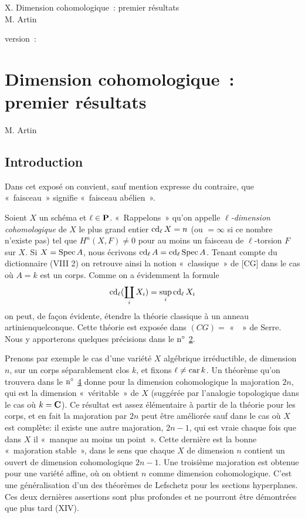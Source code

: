 \documentclass[10pt]{../fichiers-configuration-latex/smfart}
\begin{document}
\begin{center}
X. Dimension cohomologique : premier résultats\\
M. Artin
\end{center}

version : \showgitstatus{}
\tableofcontents

\else
\chapter{Dimension cohomologique : premier résultats}
\begin{center}
M. Artin
\end{center}
\fi

\setcounter{pageoriginal}{42}

\section{Introduction}\pageoriginale

Dans cet exposé on convient, sauf mention expresse du contraire, que
« faisceau » signifie « faisceau abélien ».

Soient $X$ un schéma et $\ell\in \mathbf{P}$. « Rappelons » qu'on appelle
\emph{$\ell$-dimension cohomologique} de $X$ le plus grand entier
$\operatorname{cd}_{\ell}X=n$ (ou $=\infty$ si ce nombre n'existe pas) tel que
$H^n(X,F)\neq 0$ pour au moins un faisceau de $\ell$-torsion $F$ sur
$X$. Si $X=\operatorname{Spec} A$, nous écrivons $\operatorname{cd}_{\ell} A=\operatorname{cd}_{\ell}\operatorname{Spec}
A$. Tenant compte du dictionnaire (VIII 2) %
on retrouve ainsi la notion « classique » de [CG] dans le cas où $A=k$ est un corps. Comme on
a évidemment la formule
$$
\operatorname{cd}_{\ell}(\coprod_i X_i)=\displaystyle{\mathop{\sup}_i} \operatorname{cd}_{\ell}X_i
$$
on peut, de façon évidente, étendre la théorie classique à un
anneau artinien\pageoriginale quelconque. Cette théorie est exposée dans
$(CG)=$ «  » %
de Serre. Nous y apporterons quelques précisions dans le ${\rm n^{\circ}}$ \hyperref[X.sec2]{2}.

Prenons par exemple le cas d'une variété $X$ algébrique irréductible,
de dimension $n$, sur un corps séparablement clos $k$, et fixons
$\ell\neq \operatorname{car} k$. Un théorème qu'on trouvera dans le ${\rm
  n^{\circ}}$ \hyperref[X.sec4]{4} donne pour la dimension cohomologique la majoration
$2n$, qui est la dimension « véritable » de $X$ (suggérée par
l'analogie topologique dans le cas où $k=\mathbf{C}$). Ce résultat est
assez élémentaire à partir de la théorie pour les corps, et en fait la
majoration par $2n$ peut être améliorée sauf dans le cas où $X$ est
complète: il existe une autre majoration, $2n-1$, qui est vraie chaque
fois que dans $X$ il « manque au moins un point ». Cette dernière
est la bonne « majoration stable », dans le sens que chaque $X$ de
dimension $n$ contient un ouvert de dimension cohomologique
$2n-1$. Une troisième majoration est obtenue pour une variété affine,
où on obtient $n$ comme dimension cohomologique. C'est une
généralisation d'un des théorèmes de Lefschetz pour les sections
hyperplanes. Ces deux dernières assertions sont plus profondes et ne
pourront être démontrées que plus tard (XIV).
\end{document}

